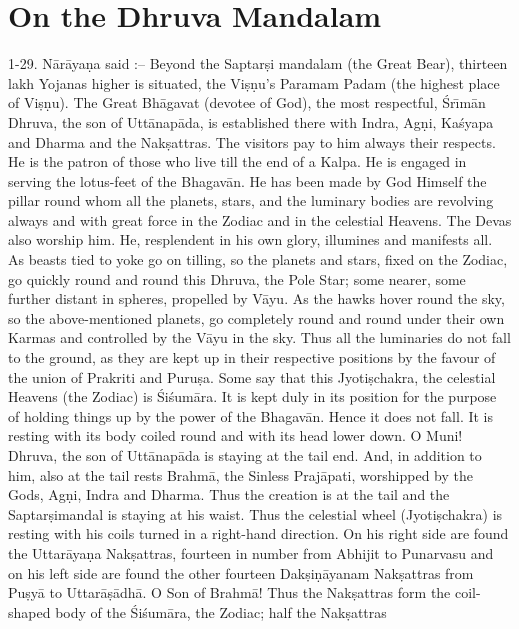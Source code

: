 \chapter{On the Dhruva Mandalam}

1-29. N\=ar\=aya\d{n}a said :-- Beyond the Saptar\d{s}i mandalam (the Great Bear), thirteen lakh Yojanas higher is situated, the Vi\d{s}\d{n}u's Paramam Padam (the highest place of Vi\d{s}\d{n}u). The Great Bh\=agavat (devotee of God), the most respectful, \'Sr\={\i}m\=an Dhruva, the son of Utt\=anap\=ada, is established there with Indra, Ag\d{n}i, Ka\'syapa and Dharma and the Nak\d{s}attras. The visitors pay to him always their respects. He is the patron of those who live till the end of a Kalpa. He is engaged in serving the lotus-feet of the Bhagav\=an. He has been made by God Himself the pillar round whom all the planets, stars, and the luminary bodies are revolving always and with great force in the Zodiac and in the celestial Heavens. The Devas also worship him. He, resplendent in his own glory, illumines and manifests all. As beasts tied to yoke go on tilling, so the planets and stars, fixed on the Zodiac, go quickly round and round this Dhruva, the Pole Star; some nearer, some further distant in spheres, propelled by V\=ayu. As the hawks hover round the sky, so the above-mentioned planets, go completely round and round under their own Karmas and controlled by the V\=ayu in the sky. Thus all the luminaries do not fall to the ground, as they are kept up in their respective positions by the favour of the union of Prakriti and Puru\d{s}a. Some say that this Jyoti\d{s}chakra, the celestial Heavens (the Zodiac) is \'Si\'sum\=ara. It is kept duly in its position for the purpose of holding things up by the power of the Bhagav\=an. Hence it does not fall. It is resting with its body coiled round and with its head lower down. O Muni! Dhruva, the son of Utt\=anap\=ada is staying at the tail end. And, in addition to him, also at the tail rests Brahm\=a, the Sinless Praj\=apati, worshipped by the Gods, Ag\d{n}i, Indra and Dharma. Thus the creation is at the tail and the Saptar\d{s}imandal is staying at his waist. Thus the celestial wheel (Jyoti\d{s}chakra) is resting with his coils turned in a right-hand direction. On his right side are found the Uttar\=aya\d{n}a Nak\d{s}attras, fourteen in number from Abhijit to Punarvasu and on his left side are found the other fourteen Dak\d{s}i\d{n}\=ayanam Nak\d{s}attras from Pu\d{s}y\=a to Uttar\=a\d{s}\=adh\=a. O Son of Brahm\=a! Thus the Nak\d{s}attras form the coil-shaped body of the \'Si\'sum\=ara, the Zodiac; half the Nak\d{s}attras

